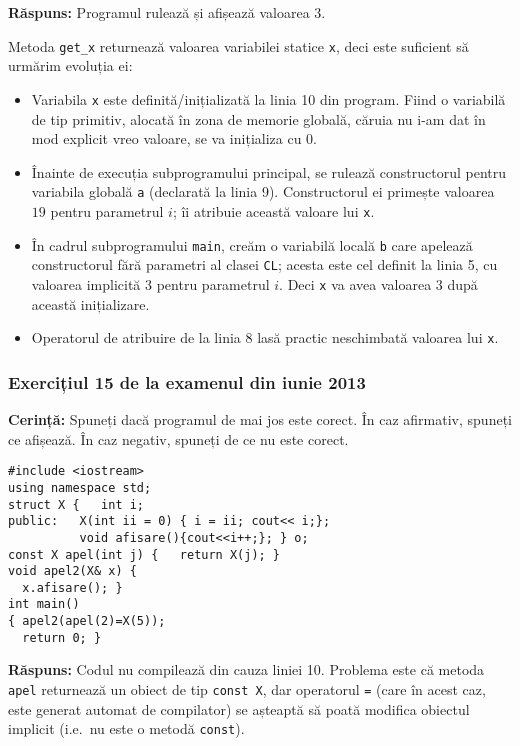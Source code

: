 \textbf{Răspuns:} Programul rulează și afișează valoarea \(3\).

Metoda \texttt{get\_x} returnează valoarea variabilei statice \texttt{x}, deci este suficient să urmărim evoluția ei:
\begin{itemize}
    \item Variabila \texttt{x} este definită/inițializată la linia 10 din program. Fiind o variabilă de tip primitiv, alocată în zona de memorie globală, căruia nu i-am dat în mod explicit vreo valoare, se va inițializa cu 0.

    \item Înainte de execuția subprogramului principal, se rulează constructorul pentru variabila globală \texttt{a} (declarată la linia 9). Constructorul ei primește valoarea \(19\) pentru parametrul \(i\); îi atribuie această valoare lui \texttt{x}.

    \item În cadrul subprogramului \texttt{main}, creăm o variabilă locală \texttt{b} care apelează constructorul fără parametri al clasei \texttt{CL}; acesta este cel definit la linia 5, cu valoarea implicită \(3\) pentru parametrul \(i\). Deci \texttt{x} va avea valoarea \(3\) după această inițializare.

    \item Operatorul de atribuire de la linia 8 lasă practic neschimbată valoarea lui \texttt{x}.
\end{itemize}

\subsubsection*{Exercițiul 15 de la examenul din iunie 2013}

\textbf{Cerință:} Spuneți dacă programul de mai jos este corect. În caz afirmativ, spuneți ce afișează. În caz negativ, spuneți de ce nu este corect.
\begin{lstlisting}
#include <iostream>
using namespace std;
struct X {   int i;
public:   X(int ii = 0) { i = ii; cout<< i;};
          void afisare(){cout<<i++;}; } o;
const X apel(int j) {   return X(j); }
void apel2(X& x) {
  x.afisare(); }
int main()
{ apel2(apel(2)=X(5));
  return 0; }
\end{lstlisting}

\textbf{Răspuns:} Codul nu compilează din cauza liniei 10. Problema este că metoda \texttt{apel} returnează un obiect de tip \texttt{const X}, dar operatorul \texttt{=} (care în acest caz, este generat automat de compilator) se așteaptă să poată modifica obiectul implicit (i.e.\ nu este o metodă \texttt{const}).